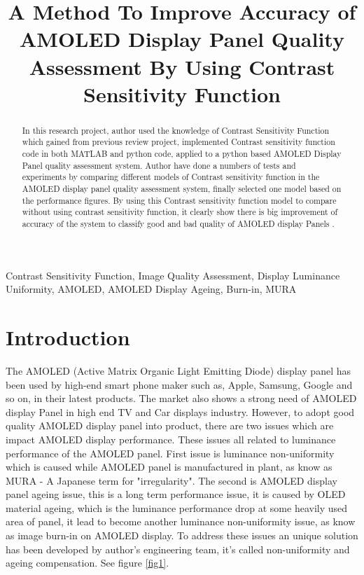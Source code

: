 \documentclass{article}
\title{A Method To Improve Accuracy of AMOLED Display Panel Quality Assessment By Using Contrast Sensitivity Function}
\begin{document}
\maketitle{}
%
\begin{abstract}
%
In this research project, author used the knowledge of Contrast Sensitivity Function which gained from previous review project, implemented Contrast sensitivity function code in both MATLAB and python code, applied to a python based AMOLED Display Panel quality assessment system. Author have done a numbers of tests and experiments by comparing different models of Contrast sensitivity function in the AMOLED display panel quality assessment system, finally selected one model based on the performance figures. By using this Contrast sensitivity function model to compare without using contrast sensitivity function, it clearly show there is big improvement of accuracy of the system to classify good and bad quality of AMOLED display Panels .
\end{abstract}

\begin{keywords}
Contrast Sensitivity Function, Image Quality Assessment, Display Luminance Uniformity, AMOLED, AMOLED Display Ageing, Burn-in, MURA
\end{keywords}
%

\section{Introduction}
The AMOLED (Active Matrix Organic Light Emitting Diode) display panel has been used by high-end smart phone maker such as, Apple, Samsung, Google and so on, in their latest products. The market also shows a strong need of AMOLED display Panel in high end TV and Car displays industry. However, to adopt good quality AMOLED display panel into product, there are two issues which are impact AMOLED display performance. These issues all related to luminance performance of the AMOLED panel. First issue is luminance non-uniformity which is caused while AMOLED panel is manufactured in plant, as know as MURA - A Japanese term for "irregularity". The second is AMOLED display panel ageing issue, this is a long term performance issue, it is caused by OLED material ageing, which is the luminance performance drop at some heavily used area of panel, it lead to become another luminance non-uniformity issue, as know as image burn-in on AMOLED display.
To address these issues an unique solution has been developed by author's engineering team, it's called non-uniformity and ageing compensation. See figure \ref{fig1}. \\
\end{document}
